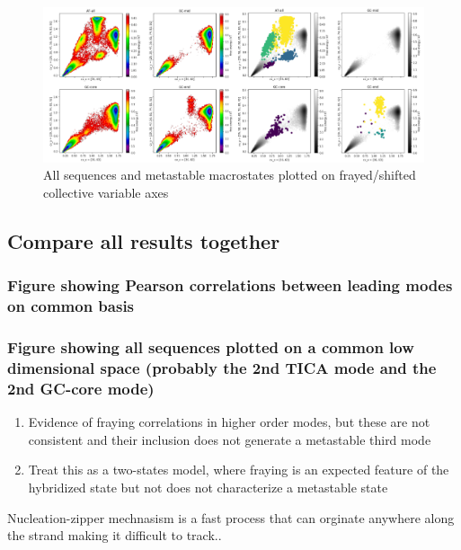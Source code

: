 \documentclass[journal=jpcbfk,manuscript=article]{achemso}
\begin{document}
\begin{figure}[ht!]
	\begin{center}
        \includegraphics[width=\textwidth]{Figs/figs_0804/all_seq_physical_cvs.PNG}
        \caption{All sequences and metastable macrostates plotted on frayed/shifted collective variable axes}
        \label{fig:all_seq_physical_cvs}
	\end{center}
\end{figure}



\subsection{\label{sec:Results}Compare all results together}
\subsubsection{\label{sec:Results}Figure showing Pearson correlations between leading modes on common basis}


\subsubsection{\label{sec:Results}Figure showing all sequences plotted on a common low dimensional space (probably the 2nd TICA mode and the 2nd GC-core mode)}

\begin{enumerate}
	\item Evidence of fraying correlations in higher order modes, but these are not consistent and their inclusion does not generate a metastable third mode
	\item Treat this as a two-states model, where fraying is an expected feature of the hybridized state but not does not characterize a metastable state
\end{enumerate}

Nucleation-zipper mechnasism is a fast process that can orginate anywhere along the strand making it difficult to track..
\end{document}
